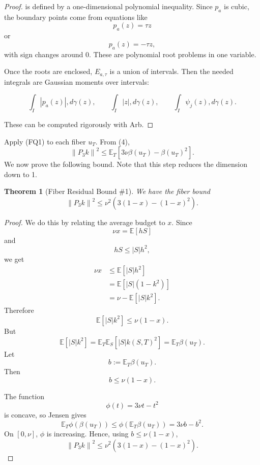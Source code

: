 \documentclass[11pt]{article}
\newtheorem{theorem}{Theorem}[section]
\newcommand{\E}{\mathbb E}
\newcommand{\norm}[1]{\left\|#1\right\|}
\begin{document}
\begin{proof}
is defined by a one-dimensional polynomial inequality. Since \(p_a\) is cubic, the boundary points come from equations like
\[
p_a(z)=\tau z
\]
or
\[
p_a(z)=-\tau z,
\]
with sign changes around \(0\). These are polynomial root problems in one variable.

Once the roots are enclosed, \(E_{a,\tau}\) is a union of intervals. Then the needed integrals are Gaussian moments over intervals:

\[
\int_I |p_a(z)|,d\gamma(z),
\qquad
\int_I |z|,d\gamma(z),
\qquad
\int_I \psi_j(z),d\gamma(z).
\]

These can be computed rigorously with Arb.    
\end{proof}

 

Apply (FQ1) to each fiber $u_T$.  From (4),
\[
        \norm{P_3k}^2
        \le
        \E_T\left[3\nu\beta(u_T)-\beta(u_T)^2\right].
\]
We now prove the following bound. Note that this step reduces the dimension down to 1.

\begin{theorem}[Fiber Residual Bound \#1]
We have the fiber bound 
\begin{equation}
        \norm{P_3k}^2
        \le
        \nu^2\left(3(1-x)-(1-x)^2\right).
\end{equation}
\end{theorem}

\begin{proof}
We do this by relating the average budget to $x$.
Since
\[
        \nu x=\E[hS]
\]
and
\[
        hS\le |S|h^2,
\]
we get
\begin{align*}
        \nu x
        &\le \E[|S|h^2]\\
        &=\E[|S|(1-k^2)]\\
        &=\nu-\E[|S|k^2].
\end{align*}
Therefore
\[
        \E[|S|k^2]\le \nu(1-x).
\]
But
\[
        \E[|S|k^2]
        =\E_T\E_S[|S|k(S,T)^2]
        =\E_T\beta(u_T).
\]
Let
\[
        b:=\E_T\beta(u_T).
\]
Then
\[
        b\le \nu(1-x).
\]

The function
\[
        \phi(t)=3\nu t-t^2
\]
is concave, so Jensen gives
\[
        \E_T\phi(\beta(u_T))\le \phi(\E_T\beta(u_T))=3\nu b-b^2.
\]
On $[0,\nu]$, $\phi$ is increasing.  Hence, using $b\le \nu(1-x)$,
\begin{equation}
        \norm{P_3k}^2
        \le
        \nu^2\left(3(1-x)-(1-x)^2\right).
        \tag{5}
\end{equation}
\end{proof}
\end{document}
